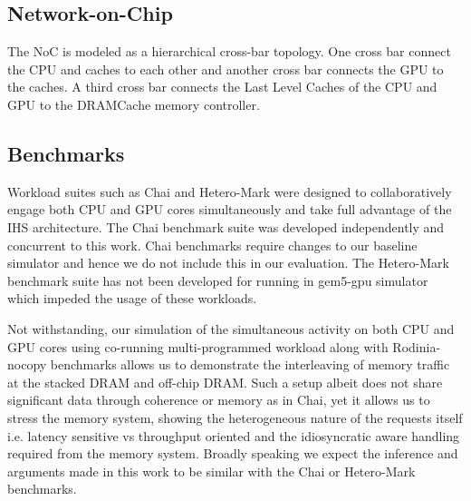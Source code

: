 \subsection{Network-on-Chip}
The NoC is modeled as a hierarchical cross-bar topology. One cross bar connect the CPU and caches to each other and another cross bar connects the GPU to the caches. A third cross bar connects the Last Level Caches of the CPU and GPU to the DRAMCache memory controller.
\subsection{Benchmarks}
Workload suites such as Chai \cite{chai} and Hetero-Mark \cite{hetero-mark} were designed to collaboratively engage both CPU and GPU cores simultaneously and take full advantage of the IHS architecture. The Chai benchmark suite was developed independently and concurrent to this work. Chai benchmarks require changes to our baseline simulator and hence we do not include this in our evaluation.
The Hetero-Mark benchmark suite has not been developed for running in gem5-gpu simulator which impeded the usage of these workloads. 
\par Not withstanding, our simulation of the simultaneous activity on both CPU and GPU cores using co-running multi-programmed workload along with Rodinia-nocopy benchmarks allows us to demonstrate the interleaving of memory traffic at the stacked DRAM and off-chip DRAM. Such a setup albeit does not share significant data through coherence or memory as in Chai, yet it allows us to stress the memory system, showing the heterogeneous nature of the requests itself i.e. latency sensitive vs throughput oriented and the idiosyncratic aware handling required from the memory system.
Broadly speaking we expect the inference and arguments made in this work to be similar with the Chai or Hetero-Mark benchmarks.
